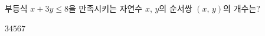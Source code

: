 \hspace*{2mm}\begin{minipage}[t]{\dimexpr\linewidth-2mm\relax}\vspace{0pt}
부등식 $x+3y\le 8$을 만족시키는 자연수 $x$, $y$의 순서쌍 $(x,\,y)$의 개수는?
\begin{choices32}{$3$}{$4$}{$5$}{$6$}{$7$}\end{choices32}\end{minipage}
